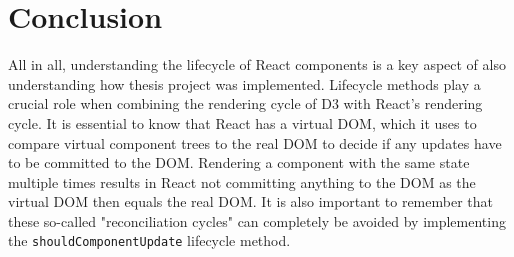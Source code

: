 \section{Conclusion}

All in all, understanding the lifecycle of React components is a key aspect of also understanding how thesis project was implemented. Lifecycle methods play a crucial role when combining the rendering cycle of D3 with React's rendering cycle. It is essential to know that React has a virtual DOM, which it uses to compare virtual component trees to the real DOM to decide if any updates have to be committed to the DOM. Rendering a component with the same state multiple times results in React not committing anything to the DOM as the virtual DOM then equals the real DOM. It is also important to remember that these so-called "reconciliation cycles" can completely be avoided by implementing the \texttt{shouldComponentUpdate} lifecycle method.






